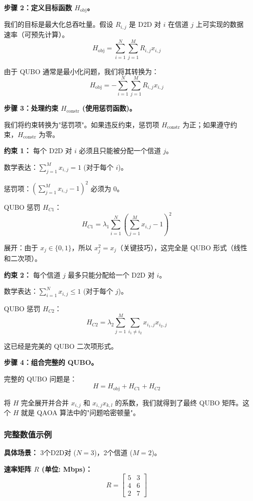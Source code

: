 \documentclass[11pt,a4paper]{article}
\begin{document}
\textbf{步骤 2：定义目标函数 $H_{\text{obj}}$。}

我们的目标是最大化总吞吐量。假设 $R_{i,j}$ 是 D2D 对 $i$ 在信道 $j$ 上可实现的数据速率（可预先计算）。
\[H_{\text{obj}} = \sum_{i=1}^{N} \sum_{j=1}^{M} R_{i,j} x_{i,j}\]

由于 QUBO 通常是最小化问题，我们将其转换为：
\[H_{\text{obj}} = -\sum_{i=1}^{N} \sum_{j=1}^{M} R_{i,j} x_{i,j}\]

\textbf{步骤 3：处理约束 $H_{\text{constr}}$ (使用惩罚函数)。}

我们将约束转换为"惩罚项"。如果违反约束，惩罚项 $H_{\text{constr}}$ 为正；如果遵守约束，$H_{\text{constr}}$ 为零。

\textbf{约束 1：} 每个 D2D 对 $i$ 必须且只能被分配一个信道 $j$。

数学表达：$\sum_{j=1}^{M} x_{i,j} = 1$ (对于每个 $i$)。

惩罚项：$\left( \sum_{j=1}^{M} x_{i,j} - 1 \right)^2$ 必须为 0。

QUBO 惩罚 $H_{C1}$：
\[H_{C1} = \lambda_1 \sum_{i=1}^{N} \left( \sum_{j=1}^{M} x_{i,j} - 1 \right)^2\]

展开：由于 $x_j \in \{0, 1\}$，所以 $x_j^2 = x_j$（关键技巧），这完全是 QUBO 形式（线性和二次项）。

\textbf{约束 2：} 每个信道 $j$ 最多只能分配给一个 D2D 对 $i$。

数学表达：$\sum_{i=1}^{N} x_{i,j} \le 1$ (对于每个 $j$)。

QUBO 惩罚 $H_{C2}$：
\[H_{C2} = \lambda_2 \sum_{j=1}^{M} \sum_{i_1 \neq i_2} x_{i_1, j} x_{i_2, j}\]

这已经是完美的 QUBO 二次项形式。

\textbf{步骤 4：组合完整的 QUBO。}

完整的 QUBO 问题是：
\[H = H_{\text{obj}} + H_{C1} + H_{C2}\]

将 $H$ 完全展开并合并 $x_{i,j}$ 和 $x_{i,j}x_{k,l}$ 的系数，我们就得到了最终 QUBO 矩阵。这个 $H$ 就是 QAOA 算法中的"问题哈密顿量"。

\subsubsection{完整数值示例}

\textbf{具体场景：} 3个D2D对 ($N=3$)，2个信道 ($M=2$)。

\textbf{速率矩阵 $R$ (单位: Mbps)：}
\[R = \begin{bmatrix}
5 & 3 \\
4 & 6 \\
2 & 7
\end{bmatrix}\]
\end{document}
